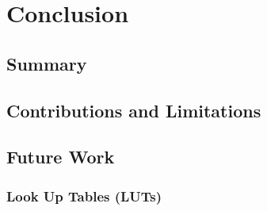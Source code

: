 \documentclass[../MasterThesis.tex]{subfiles}
\begin{document}
	
	
%
%
%
%
%
%
%
%
\newpage
\section{Conclusion} \label{section:conclusion}


\subsection{Summary} \label{subsection:summary}


\subsection{Contributions and Limitations} \label{subsection:contributionsandlimitations}


\subsection{Future Work} \label{subsection:futurework}

\subsubsection{Look Up Tables (LUTs)}



	
	
	
\end{document}

